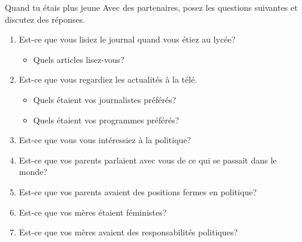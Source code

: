 \begin{frame}{Quand tu étais plus jeune}
  Avec des partenaires, posez les questions suivantes et discutez des réponses.
  \begin{enumerate}
    \item Est-ce que vous lisiez le journal quand vous étiez au lycée?
    \begin{itemize}
      \item Quels articles lisez-vous?
    \end{itemize}
    \item Est-ce que vous regardiez les actualités à la télé.
    \begin{itemize}
      \item Quels étaient vos journalistes préférés?
      \item Quels étaient vos programmes préférés?
    \end{itemize}
    \item Est-ce que vous vous intéressiez à la politique?
    \item Est-ce que vos parents parlaient avec vous de ce qui se passait dans le monde?
    \item Est-ce que vos parents avaient des positions fermes en politique?
    \item Est-ce que vos mères étaient féministes?
    \item Est-ce que vos mères avaient des responsabilités politiques?
  \end{enumerate}
\end{frame}